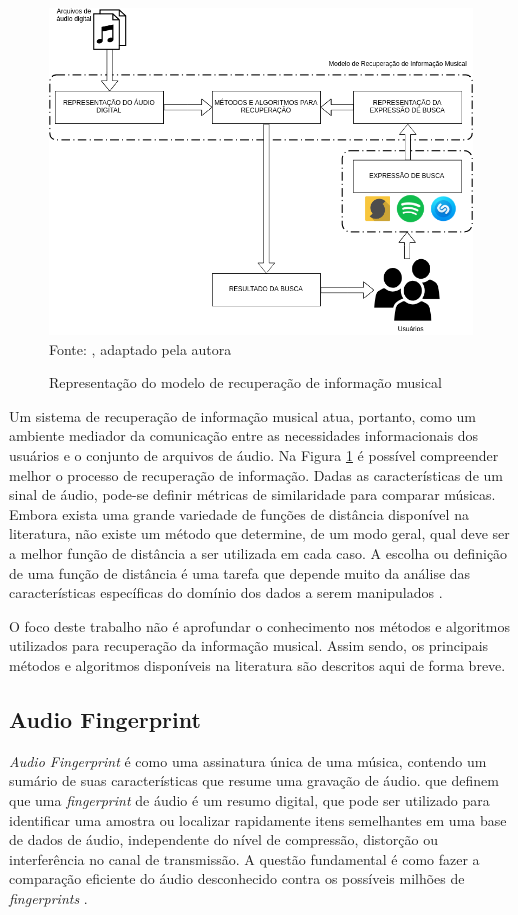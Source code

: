\begin{figure}[!ht]
   \centering
   \caption{Representação do modelo de recuperação de informação musical} 
   \label{fig:modeloRecInfo} 
   \includegraphics[scale=0.30]{figuras/modeloRecInfo.png}
   \\Fonte: \cite{ferreira2015}, adaptado pela autora
\end{figure}

Um sistema de recuperação de informação musical atua, portanto, como um ambiente mediador da comunicação entre as necessidades informacionais dos usuários e o conjunto de arquivos de áudio. Na Figura \ref{fig:modeloRecInfo} é possível compreender melhor o processo de recuperação de informação. Dadas as características de um sinal de áudio, pode-se definir métricas de similaridade para comparar músicas. Embora exista uma grande variedade de funções de distância disponível na literatura, não existe um método que determine, de um modo geral, qual deve ser a melhor função de distância a ser utilizada em cada caso. A escolha ou definição de uma função de distância é uma tarefa que depende muito da análise das características específicas do domínio dos dados a serem manipulados \cite{barioni2006}.

O foco deste trabalho não é aprofundar o conhecimento nos métodos e algoritmos utilizados para recuperação da informação musical. Assim sendo, os principais métodos e algoritmos disponíveis na literatura são descritos aqui de forma breve.

\subsection{Audio Fingerprint} \label{subsec:audioFingerprint}
\textit{Audio Fingerprint} é como uma assinatura única de uma música, contendo um sumário de suas características que resume uma gravação de áudio. \cite{cano2005} que definem que uma \textit{fingerprint} de áudio é um resumo digital, que pode ser utilizado para identificar uma amostra ou localizar rapidamente itens semelhantes em uma base de dados de áudio, independente do nível de compressão, distorção ou interferência no canal de transmissão. A questão fundamental é como fazer a comparação eficiente do áudio desconhecido contra os possíveis milhões de \textit{fingerprints} \cite{cano2005}.

